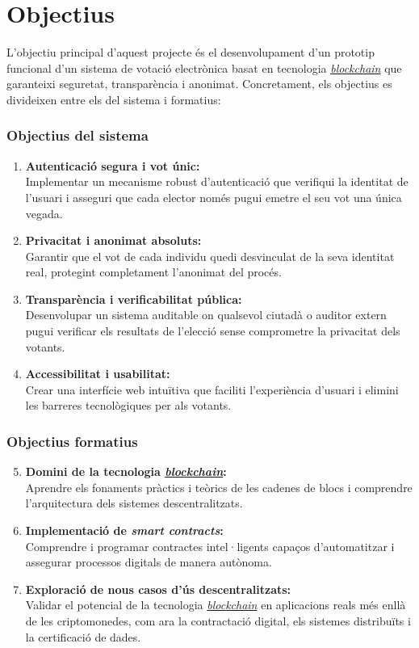\section{Objectius}

L'objectiu principal d'aquest projecte és el desenvolupament d'un prototip funcional d'un sistema de votació electrònica basat en tecnologia \hyperlink{def:blockchain}{\textit{blockchain}} que garanteixi seguretat, transparència i anonimat. Concretament, els objectius es divideixen entre els del sistema i formatius:

\subsubsection*{Objectius del sistema}
\begin{enumerate}
    \item \textbf{Autenticació segura i vot únic:} \\ Implementar un mecanisme robust d'autenticació que verifiqui la identitat de l'usuari i asseguri que cada elector només pugui emetre el seu vot una única vegada.
    \item \textbf{Privacitat i anonimat absoluts:} \\ Garantir que el vot de cada individu quedi desvinculat de la seva identitat real, protegint completament l'anonimat del procés.
    \item \textbf{Transparència i verificabilitat pública:} \\ Desenvolupar un sistema auditable on qualsevol ciutadà o auditor extern pugui verificar els resultats de l'elecció sense comprometre la privacitat dels votants.
    \item \textbf{Accessibilitat i usabilitat:} \\ Crear una interfície web intuïtiva que faciliti l'experiència d'usuari i elimini les barreres tecnològiques per als votants.
\end{enumerate}

\subsubsection*{Objectius formatius}
\begin{enumerate}
    \setcounter{enumi}{4}
    \item \textbf{Domini de la tecnologia \hyperlink{def:blockchain}{\textit{blockchain}}:} \\ Aprendre els fonaments pràctics i teòrics de les cadenes de blocs i comprendre l'arquitectura dels sistemes descentralitzats.
    \item \textbf{Implementació de \textit{smart contracts}:} \\ Comprendre i programar contractes intel·ligents capaços d'automatitzar i assegurar processos digitals de manera autònoma.
    \item \textbf{Exploració de nous casos d'ús descentralitzats:} \\ Validar el potencial de la tecnologia \hyperlink{def:blockchain}{\textit{blockchain}} en aplicacions reals més enllà de les criptomonedes, com ara la contractació digital, els sistemes distribuïts i la certificació de dades.
\end{enumerate}